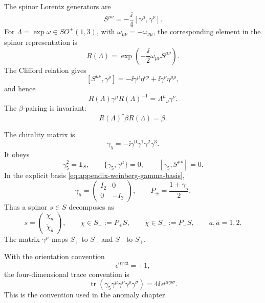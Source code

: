 \begin{definition}
\label{def:spin-representation-and-chirality}
The spinor Lorentz generators are
\begin{equation}
  S^{\mu\nu}
  =
  -\frac{\ii}{4}[\gamma^\mu,\gamma^\nu].
  \label{eq:appendix-spin-generators}
\end{equation}
For \(\Lambda=\exp\omega\in SO^+(1,3)\), with
\(\omega_{\mu\nu}=-\omega_{\nu\mu}\), the corresponding element in the
spinor representation is
\[
  R(\Lambda)
  =
  \exp\!\left(-\frac{\ii}{2}\omega_{\mu\nu}S^{\mu\nu}\right).
\]
The Clifford relation gives
\[
  [S^{\mu\nu},\gamma^\rho]
  =
  -\ii\gamma^\mu\eta^{\nu\rho}
  +\ii\gamma^\nu\eta^{\mu\rho},
\]
and hence
\[
  R(\Lambda)\gamma^\mu R(\Lambda)^{-1}
  =
  \Lambda^\mu{}_\nu\gamma^\nu .
\]
The \(\beta\)-pairing is invariant:
\[
  R(\Lambda)^\dagger\beta R(\Lambda)=\beta .
\]

The chirality matrix is
\begin{equation}
  \gamma_5=-\ii\gamma^0\gamma^1\gamma^2\gamma^3 .
  \label{eq:appendix-gamma-five}
\end{equation}
It obeys
\[
  \gamma_5^2=\mathbf 1_S,
  \qquad
  \{\gamma_5,\gamma^\mu\}=0,
  \qquad
  [\gamma_5,S^{\mu\nu}]=0 .
\]
In the explicit basis \eqref{eq:appendix-weinberg-gamma-basis},
\[
  \gamma_5=
  \begin{pmatrix}
    I_2&0\\0&-I_2
  \end{pmatrix},
  \qquad
  P_\pm=\frac{1\pm\gamma_5}{2}.
\]
Thus a spinor \(s\in S\) decomposes as
\[
  s=
  \begin{pmatrix}\chi_a\\ \widetilde\chi_{\dot a}\end{pmatrix},
  \qquad
  \chi\in S_+:=P_+S,
  \qquad
  \widetilde\chi\in S_-:=P_-S,
  \qquad
  a,\dot a=1,2 .
\]
The matrix \(\gamma^\mu\) maps \(S_+\) to \(S_-\) and \(S_-\) to \(S_+\).

With the orientation convention
\[
  \epsilon^{0123}=+1,
\]
the four-dimensional trace convention is
\begin{equation}
  \operatorname{tr}
  \left(\gamma_5\gamma^\mu\gamma^\nu\gamma^\rho\gamma^\sigma\right)
  =
  4\ii\,\epsilon^{\mu\nu\rho\sigma}.
  \label{eq:appendix-gamma-five-trace}
\end{equation}
This is the convention used in the anomaly chapter.
\end{definition}

